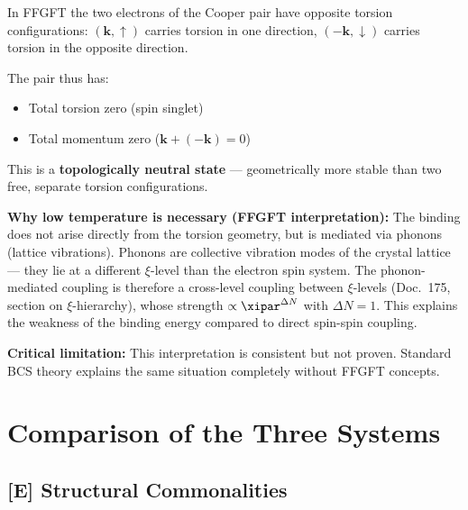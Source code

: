 \begin{foundation}
In FFGFT the two electrons of the Cooper pair have
opposite torsion configurations:
$(\mathbf{k}, \uparrow)$ carries torsion in one direction,
$(-\mathbf{k}, \downarrow)$ carries torsion in the opposite direction.

The pair thus has:
\begin{itemize}
  \item Total torsion zero (spin singlet)
  \item Total momentum zero ($\mathbf{k} + (-\mathbf{k}) = 0$)
\end{itemize}

This is a \textbf{topologically neutral state} ---
geometrically more stable than two free, separate torsion configurations.

\textbf{Why low temperature is necessary (FFGFT interpretation):}
The binding does not arise directly from the torsion geometry,
but is mediated via phonons (lattice vibrations).
Phonons are collective vibration modes of the crystal lattice ---
they lie at a different $\xi$-level than the electron spin system.
The phonon-mediated coupling is therefore a
cross-level coupling between $\xi$-levels
(Doc.~175, section on $\xi$-hierarchy),
whose strength $\propto \xipar^{\Delta N}$ with $\Delta N = 1$.
This explains the weakness of the binding energy
compared to direct spin-spin coupling.

\textbf{Critical limitation:}
This interpretation is consistent but not proven.
Standard BCS theory explains the same situation
completely without FFGFT concepts.
\end{foundation}

\section{Comparison of the Three Systems}
\label{sec:comparison}

\subsection{[E] Structural Commonalities}

